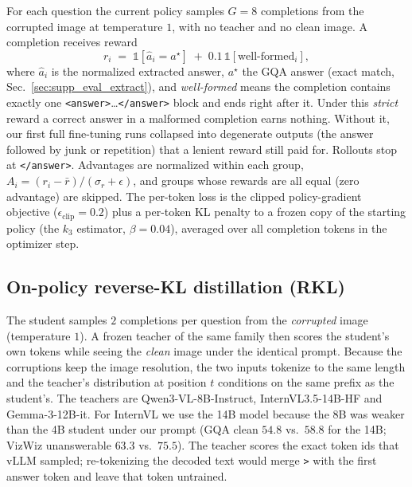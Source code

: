 For each question the current policy samples $G{=}8$ completions from the corrupted image
at temperature $1$, with no teacher and no clean image. A completion receives reward
\begin{equation}
  r_i \;=\; \mathbb{1}[\hat a_i = a^\star] \;+\; 0.1\,\mathbb{1}[\text{well-formed}_i],
\end{equation}
where $\hat a_i$ is the normalized extracted answer, $a^\star$ the GQA answer (exact
match, Sec.~\ref{sec:supp_eval_extract}), and \emph{well-formed} means the completion
contains exactly one \texttt{<answer>}\dots\texttt{</answer>} block and ends right after
it. Under this \emph{strict} reward a correct answer in a malformed completion earns
nothing. Without it, our first full fine-tuning runs collapsed into degenerate outputs
(the answer followed by junk or repetition) that a lenient reward still paid for.
Rollouts stop at \texttt{</answer>}. Advantages are normalized within each group,
$A_i=(r_i-\bar r)/(\sigma_r+\epsilon)$, and groups whose rewards are all equal (zero
advantage) are skipped. The per-token loss is the clipped policy-gradient objective
($\epsilon_{\text{clip}}{=}0.2$) plus a per-token KL penalty to a frozen copy of the
starting policy (the $k_3$ estimator, $\beta{=}0.04$), averaged over all completion
tokens in the optimizer step.

\subsection{On-policy reverse-KL distillation (RKL)}
\label{sec:supp_train_rkl}

The student samples $2$ completions per question from the \emph{corrupted} image
(temperature $1$). A frozen teacher of the same family then scores the student's own
tokens while seeing the \emph{clean} image under the identical prompt. Because the
corruptions keep the image resolution, the two inputs tokenize to the same length and the
teacher's distribution at position $t$ conditions on the same prefix as the student's.
The teachers are Qwen3-VL-8B-Instruct, InternVL3.5-14B-HF and Gemma-3-12B-it. For
InternVL we use the 14B model because the 8B was weaker than the 4B student under our
prompt (GQA clean $54.8$ vs.\ $58.8$ for the 14B; VizWiz unanswerable $63.3$ vs.\
$75.5$). The teacher scores the exact token ids that vLLM sampled; re-tokenizing the
decoded text would merge \texttt{>} with the first answer token and leave that token
untrained.

